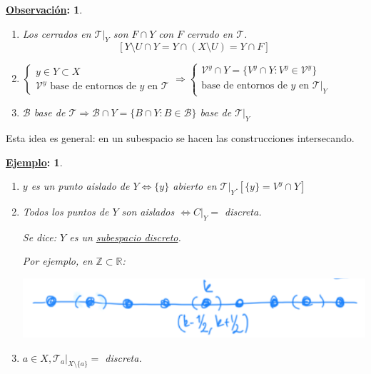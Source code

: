\documentclass[10pt,a4paper,openright]{book}
\theoremstyle{break}
\newtheorem*{obs}{\underline{Observación}:}
\newtheorem*{ej}{\underline{Ejemplo}:}
\begin{document}
\begin{obs}
\begin{enumerate}
    \item Los cerrados en $\mathcal{T}|_Y$ son $F\cap Y$ con $F$ cerrado en $\mathcal{T}$.
    \[
    \left[ Y \setminus U \cap Y = Y \cap \left( X \setminus U \right) = Y\cap F \right] 
    \]
    \item 
    $\begin{cases}
        y \in Y \subset X\\
        \mathcal{V}^y \text{ base de entornos de } y \text{ en } \mathcal{T} 
    \end{cases}\Rightarrow \begin{cases}
        \mathcal{V}^y \cap Y = \{V^y \cap Y : V^y \in \mathcal{V}^y\} \\
        \text{base de entornos de } y \text{ en } \mathcal{T}|_Y 
    \end{cases}$

    \item $\mathcal{B}$ base de $\mathcal{T} \Rightarrow \mathcal{B} \cap Y = \{B \cap Y : B \in \mathcal{B}\}$ base de $\mathcal{T}|_Y$
\end{enumerate}
\end{obs}

Esta idea es general: en un subespacio se hacen las construcciones intersecando.

\begin{ej}
\begin{enumerate}
    \item $y$ es un punto aislado de $Y \Leftrightarrow \{y\}$ abierto en $\mathcal{T}|_Y. \left[ \{y\} = V^y \cap Y \right]$
    \item Todos los puntos de $Y$ son aislados $\Leftrightarrow C|_Y = $ discreta.

    Se dice: $Y$ es un \underline{subespacio discreto}. 

    Por ejemplo, en $\mathbb{Z} \subset \mathbb{R}$:
    \begin{center}
        \includegraphics[scale=0.3]{images/def_subespacio_discreto} 
    \end{center}

    \item $a \in X, \mathcal{T}_a|_{X \setminus \{a\}} = $ discreta.
\end{enumerate}
\end{ej}
\end{document}
